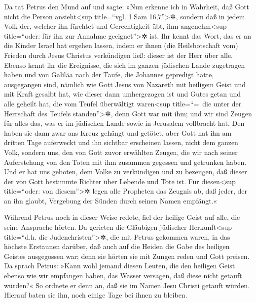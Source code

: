  Da tat Petrus den Mund auf und sagte: »Nun erkenne ich
in Wahrheit, daß Gott nicht die Person ansieht\textless sup title=``vgl.
1.Sam 16,7''\textgreater✲,  sondern daß in jedem Volk
der, welcher ihn fürchtet und Gerechtigkeit übt, ihm
angenehm\textless sup title=``oder: für ihn zur Annahme
geeignet''\textgreater✲ ist.  Ihr kennt das Wort, das er
an die Kinder Israel hat ergehen lassen, indem er ihnen (die
Heilsbotschaft vom) Frieden durch Jesus Christus verkündigen ließ:
dieser ist der Herr über alle.  Ebenso kennt ihr die
Ereignisse, die sich im ganzen jüdischen Lande zugetragen haben und von
Galiläa nach der Taufe, die Johannes gepredigt hatte, ausgegangen sind,
 nämlich wie Gott Jesus von Nazareth mit heiligem Geist
und mit Kraft gesalbt hat, wie dieser dann umhergezogen ist und Gutes
getan und alle geheilt hat, die vom Teufel überwältigt
waren\textless sup title=``=~die unter der Herrschaft des Teufels
standen''\textgreater✲, denn Gott war mit ihm;  und wir
sind Zeugen für alles das, was er im jüdischen Lande sowie in Jerusalem
vollbracht hat. Den haben sie dann zwar ans Kreuz gehängt und getötet,
 aber Gott hat ihn am dritten Tage auferweckt und ihn
sichtbar erscheinen lassen,  nicht dem ganzen Volk,
sondern uns, den von Gott zuvor erwählten Zeugen, die wir nach seiner
Auferstehung von den Toten mit ihm zusammen gegessen und getrunken
haben.  Und er hat uns geboten, dem Volke zu verkündigen
und zu bezeugen, daß dieser der von Gott bestimmte Richter über Lebende
und Tote ist.  Für diesen\textless sup title=``oder: von
diesem''\textgreater✲ legen alle Propheten das Zeugnis ab, daß jeder,
der an ihn glaubt, Vergebung der Sünden durch seinen Namen empfängt.«

 Während Petrus noch in dieser Weise redete, fiel der
heilige Geist auf alle, die seine Ansprache hörten.  Da
gerieten die Gläubigen jüdischer Herkunft\textless sup title=``d.h. die
Judenchristen''\textgreater✲, die mit Petrus gekommen waren, in das
höchste Erstaunen darüber, daß auch auf die Heiden die Gabe des heiligen
Geistes ausgegossen war;  denn sie hörten sie mit Zungen
reden und Gott preisen. Da sprach Petrus:  »Kann wohl
jemand diesen Leuten, die den heiligen Geist ebenso wie wir empfangen
haben, das Wasser versagen, daß diese nicht getauft würden?«
 So ordnete er denn an, daß sie im Namen Jesu Christi
getauft würden. Hierauf baten sie ihn, noch einige Tage bei ihnen zu
bleiben.

